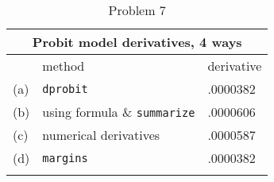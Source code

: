 \begin{table}[h!]
\caption{Problem 7}
	\label{q7b}
\begin{center}
\begin{tabular}{lll}
\multicolumn{3}{c}{Probit model derivatives, 4 ways} \\
\toprule
& method & derivative \\
\hline
\addlinespace
(a) & \texttt{dprobit} & .0000382\\ \addlinespace
(b) & using formula \& \texttt{summarize} & .0000606\\ \addlinespace
(c) &  numerical derivatives & .0000587\\ \addlinespace
(d) & \texttt{margins} & .0000382\\ \addlinespace
\bottomrule
\end{tabular}
\end{center}
\end{table}
